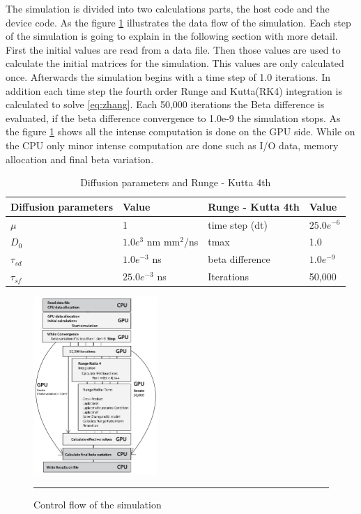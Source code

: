 The simulation is divided into two calculations parts, the host code and the device code. As the figure \ref{fig:flow} illustrates the data flow of the simulation. Each step of the simulation is going to explain in the following section with more detail. First the initial values are read from a data file. Then those values are used to calculate the initial matrices for the simulation. This values are only calculated once. Afterwards the simulation begins with a time step of 1.0  iterations. In addition each time step the fourth order Runge and Kutta(RK4) integration is calculated to solve \ref{eq:zhang}. Each 50,000 iterations the Beta difference is evaluated, if the beta difference convergence to 1.0e-9 the simulation stops. As the figure \ref{fig:flow} shows all the intense computation is done on the GPU side. While on the  CPU only minor intense computation are done such as I/O data, memory allocation and final beta variation.

\begin{table}[h]
\centering
\begin{tabular}{| l | l | l | l |}
\hline
Diffusion parameters& Value & Runge - Kutta 4th & Value \\
\hline 
$\mu$ & 1 &  time step (dt) &   $25.0e^{-6}$   \\
\hline
$D_{0}$ & $1.0e^{3}$ nm mm$^2$/ns  & tmax  & 1.0  \\
\hline
$\tau_{sd}$ & $1.0e^{-3}$ ns  & beta difference & $1.0e^{-9}$ \\
\hline
$\tau_{sf}$ & $25.0e^{-3}$ ns  & Iterations & 50,000 \\
\hline
\end{tabular}
\caption{Diffusion parameters and Runge - Kutta 4th}
\label{tab:drk}
\end{table}

\begin{figure}[htbp]
	\centering
		\includegraphics[width=0.42\textwidth]{Figures/flow.png}
		\rule{35em}{0.2pt}
	\caption[Control flow]{Control flow of the simulation}
	\label{fig:flow}
\end{figure}

